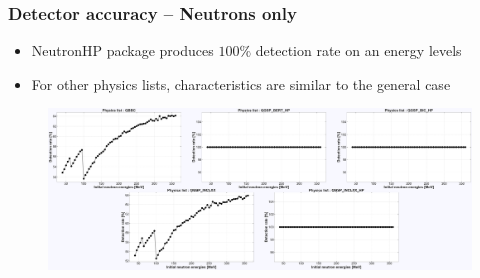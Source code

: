\begin{frame}
\frametitle{Detector accuracy -- Neutrons only}

\begin{block}{}
	\begin{itemize}
		\item NeutronHP package produces $100\%$ detection rate on an energy levels
		\item For other physics lists, characteristics are similar to the general case
	\end{itemize}
\end{block}

\begin{figure}
	\includegraphics[width=\textwidth]{images/detection_rates_neutron_only.pdf}
\end{figure}


\end{frame}